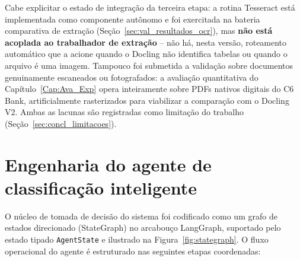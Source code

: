 Cabe explicitar o estado de integração da terceira etapa: a rotina Tesseract está implementada como componente autônomo e foi exercitada na bateria comparativa de extração (Seção~\ref{sec:val_resultados_ocr}), mas \textbf{não está acoplada ao trabalhador de extração} -- não há, nesta versão, roteamento automático que a acione quando o Docling não identifica tabelas ou quando o arquivo é uma imagem. Tampouco foi submetida a validação sobre documentos genuinamente escaneados ou fotografados: a avaliação quantitativa do Capítulo~\ref{Cap:Ava_Exp} opera inteiramente sobre PDFs nativos digitais do C6 Bank, artificialmente rasterizados para viabilizar a comparação com o Docling V2. Ambas as lacunas são registradas como limitação do trabalho (Seção~\ref{sec:concl_limitacoes}).

\section{Engenharia do agente de classificação inteligente}
\label{sec:sol_agente_inteligente}

O núcleo de tomada de decisão do sistema foi codificado como um grafo de estados direcionado (StateGraph) no arcabouço LangGraph, suportado pelo estado tipado \texttt{AgentState} e ilustrado na Figura~\ref{fig:stategraph}. O fluxo operacional do agente é estruturado nas seguintes etapas coordenadas:

